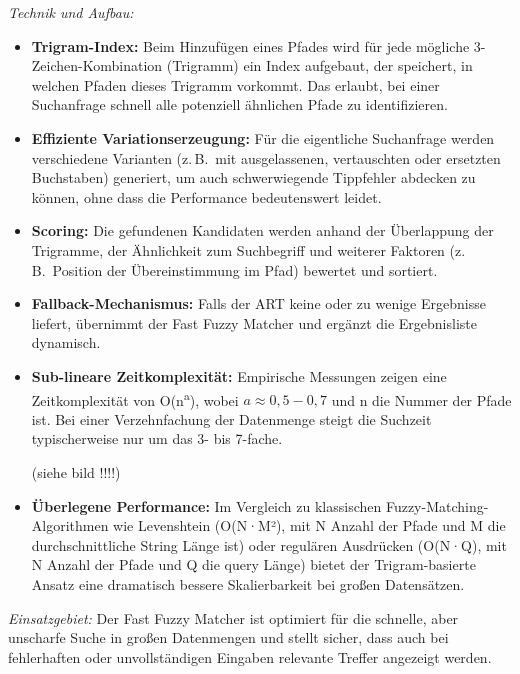 \textit{Technik und Aufbau:}
\begin{itemize}
  \item \textbf{Trigram-Index:} Beim Hinzufügen eines Pfades wird für jede mögliche 3-Zeichen-Kombination (Trigramm) ein Index
    aufgebaut, der speichert, in welchen Pfaden dieses Trigramm vorkommt. Das erlaubt, bei einer Suchanfrage schnell alle
    potenziell ähnlichen Pfade zu identifizieren.

  \item \textbf{Effiziente Variationserzeugung:} Für die eigentliche Suchanfrage werden verschiedene Varianten (z.\,B.\ mit
    ausgelassenen, vertauschten oder ersetzten Buchstaben) generiert, um auch schwerwiegende Tippfehler abdecken zu können, ohne
    dass die Performance bedeutenswert leidet.

  \item \textbf{Scoring:} Die gefundenen Kandidaten werden anhand der Überlappung der Trigramme, der Ähnlichkeit zum Suchbegriff
    und weiterer Faktoren (z.\,B.\ Position der Übereinstimmung im Pfad) bewertet und sortiert.

	\item \textbf{Fallback-Mechanismus:} Falls der ART keine oder zu wenige Ergebnisse liefert, übernimmt der Fast Fuzzy Matcher und ergänzt die Ergebnisliste dynamisch.

  \item \textbf{Sub-lineare Zeitkomplexität:} Empirische Messungen zeigen eine Zeitkomplexität von O(n\textsuperscript{a}), wobei
    $a \approx 0,5-0,7$ und n die Nummer der Pfade ist. Bei einer Verzehnfachung der Datenmenge steigt die Suchzeit typischerweise
    nur um das 3- bis 7-fache.

	      (siehe bild !!!!)

  \item \textbf{Überlegene Performance:} Im Vergleich zu klassischen Fuzzy-Matching-Algorithmen wie Levenshtein (O(N·M²), mit N
    Anzahl der Pfade und M die durchschnittliche String Länge ist) oder regulären Ausdrücken (O(N·Q), mit N Anzahl der Pfade und Q
    die query Länge) bietet der Trigram-basierte Ansatz eine dramatisch bessere Skalierbarkeit bei großen Datensätzen.
\end{itemize}

\textit{Einsatzgebiet:} Der Fast Fuzzy Matcher ist optimiert für die schnelle, aber unscharfe Suche in großen Datenmengen und
stellt sicher, dass auch bei fehlerhaften oder unvollständigen Eingaben relevante Treffer angezeigt werden.

